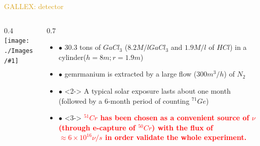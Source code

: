\documentclass[11pt]{beamer} %
\renewcommand{\(}{\begin{columns}}
\renewcommand{\)}{\end{columns}}
\newcommand{\<}[1]{\begin{column}{#1}}
\renewcommand{\>}{\end{column}}
\newcommand{\itt}{\begin{itemize}}
\newcommand{\tti}{\end{itemize}}
\newcommand{\img}[1]{\texttt{[image: ./Images/\#1]}}
\newcommand{\hlt}[2]{\textcolor{#1}{\textbf{#2}}}
\begin{document}
\begin{frame}{\textcolor{Goldenrod}{GALLEX: detector}}
  \(
  \<{0.4\textwidth}
  \img{GALLEX01}
  \>
  \<{0.7\textwidth}
  \itt
\item[$\bullet$] $30.3$ tons of $GaCl_3$ ($8.2 M/l GaCl_3$ and $1.9
  M/l$ of $HCl$) in a cylinder($h= 8m ;r = 1.9 m$)
\item[$\bullet$] gemrmanium is extracted by a large flow ($300 m^3/h$) of $N_2$
  
\item[$\bullet$]<2-> A typical solar exposure lasts about one month (followed by a
  6-month period of counting $^{71}Ge$)
\item[$\bullet$]<3-> \hlt{Red}{$^{51}Cr$ has been chosen as a convenient source of $\nu$
  (through e-capture of $^{50}Cr$) with the flux of $\approx 6\times
  10^{16} \nu/s$ in order validate the whole experiment.}
\tti
\>
\)
\end{frame}

\end{document}
